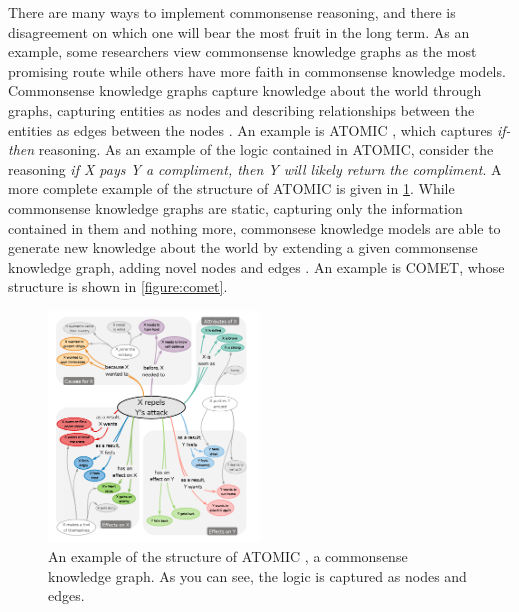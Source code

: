 \documentclass[12pt]{report}
\begin{document}
There are many ways to implement commonsense reasoning, and there is disagreement on which one will bear the most fruit in the long term.
As an example, some researchers view commonsense knowledge graphs as the most promising route while others have more faith in commonsense knowledge models.
Commonsense knowledge graphs capture knowledge about the world through graphs, capturing entities as nodes and describing relationships between the entities as edges between the nodes \cite{Kim2022-pz}.
An example is ATOMIC \cite{Sap2019-ob}, which captures \textit{if-then} reasoning.
As an example of the logic contained in ATOMIC, consider the reasoning \textit{if \textup{X} pays \textup{Y} a compliment, then \textup{Y} will likely return the compliment}.
A more complete example of the structure of ATOMIC is given in \cref{figure:atomic}.
While commonsense knowledge graphs are static, capturing only the information contained in them and nothing more, commonsese knowledge models are able to generate new knowledge about the world \cite{Kim2022-pz} by extending a given commonsense knowledge graph, adding novel nodes and edges \cite{Kim2022-pz,Bosselut2019-he}.
An example is COMET, whose structure is shown in \cref{figure:comet}.

\begin{figure}
    \includegraphics[width=0.5\textwidth]{diagrams/atomic-example.png}
    \caption{An example of the structure of ATOMIC \cite{Sap2019-ob}, a commonsense knowledge graph. As you can see, the logic is captured as nodes and edges.}
    \label{figure:atomic}
\end{figure}
\end{document}
